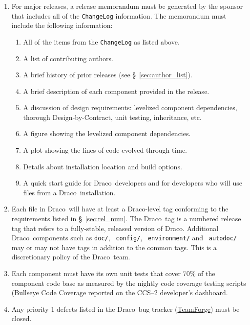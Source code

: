 \documentclass[note]{newmemo}
\newcommand{\draco}{{\normalfont\small\sffamily Draco}}
\begin{document}
\begin{enumerate}
\item For major releases, a release memorandum must be generated by the
  sponsor that includes all of the \texttt{ChangeLog} information.
  The memorandum must include the following information:
  \begin{enumerate}
    \item All of the items from the \texttt{ChangeLog} as listed above.
    \item A list of contributing authors.
    \item A brief history of prior releases (see
      \S~\ref{sec:author_list}).
    \item A brief description of each component provided in the
      release. 
    \item A discussion of design requirements: levelized component
      dependencies, thorough Design-by-Contract, unit testing,
      inheritance, etc.
    \item A figure showing the levelized component dependencies.
    \item A plot showing the lines-of-code evolved through time.
    \item Details about installation location and build options.
    \item A quick start guide for \draco\ developers and for
      developers who will use files from a \draco\ installation.
  \end{enumerate}
\item Each file in \draco\ will have at least a \draco-level tag
  conforming to the requirements listed in \S~\ref{sec:rel_num}.  The
  \draco\ tag is a numbered release tag that refers to a fully-stable,
  released version of \draco. Additional \draco\ components such as
  \texttt{doc/}, ~\texttt{config/}, ~\texttt{environment/} and
  ~\texttt{autodoc/} may or may not have tags in addition to the
  common tags.  This is a discretionary policy of the \draco\ team.

\item Each component must have its own unit tests that cover 70\% of
  the component code base as measured by the nightly code coverage
  testing scripts (Bullseye Code Coverage\cite{bullseyeweb} reported
  on the CCS--2 developer's dashboard\cite{codercdash,cmake}.

\item Any priority 1 defects listed in the \draco\ bug tracker
  (\href{https://tf.lanl.gov/sf/tracker/do/listTrackers/projects.draco/tracker}{TeamForge})
  must be closed. 


\end{enumerate}
\end{document}
